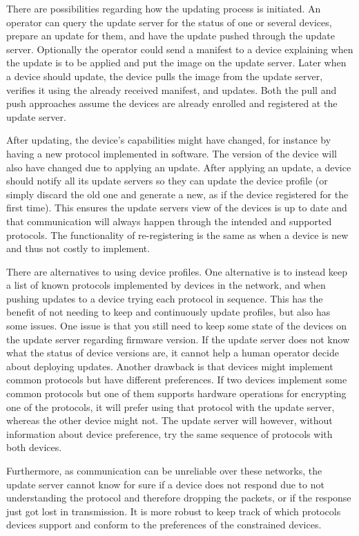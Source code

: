 \documentclass[0-thesis.tex]{subfiles}
\begin{document}
There are possibilities regarding how the updating process is initiated. An operator can
query the update server for the status of one or several devices, prepare an update for
them, and have the update pushed through the update server. Optionally the operator could
send a manifest to a device explaining when the update is to be applied and put the
image on the update server. Later when a device should update, the device pulls the
image from the update server, verifies it using the already received manifest, and
updates. Both the pull and push approaches assume the devices are already enrolled and
registered at the update server.

After updating, the device's capabilities might have changed, for instance by having a new
protocol implemented in software. The version of the device will also have changed due to
applying an update. After applying an update, a device should notify all its update
servers so they can update the device profile (or simply discard the old one and generate
a new, as if the device registered for the first time). This ensures the update servers
view of the devices is up to date and that communication will always happen through the
intended and supported protocols. The functionality of re-registering is the same as when
a device is new and thus not costly to implement.

There are alternatives to using device profiles. One alternative is to instead keep a list
of known protocols implemented by devices in the network, and when pushing updates to a
device trying each protocol in sequence. This has the benefit of not needing to keep and
continuously update profiles, but also has some issues. One issue is that you still need
to keep some state of the devices on the update server regarding firmware version. If the
update server does not know what the status of device versions are, it cannot help a human
operator decide about deploying updates. Another drawback is that devices might implement
common protocols but have different preferences. If two devices implement some common
protocols but one of them supports hardware operations for encrypting one of the
protocols, it will prefer using that protocol with the update server, whereas the other
device might not. The update server will however, without information about device
preference, try the same sequence of protocols with both devices.

Furthermore, as communication can be unreliable over these networks, the update server
cannot know for sure if a device does not respond due to not understanding the protocol
and therefore dropping the packets, or if the response just got lost in transmission. It
is more robust to keep track of which protocols devices support and conform to the
preferences of the constrained devices.
\end{document}
